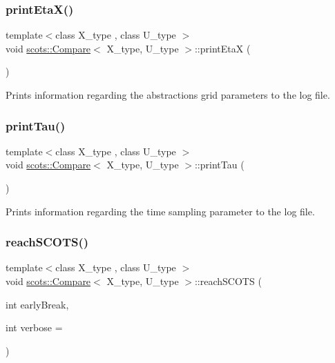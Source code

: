 \subsubsection{\texorpdfstring{print\+Eta\+X()}{printEtaX()}}
{\footnotesize\ttfamily template$<$class X\+\_\+type , class U\+\_\+type $>$ \\
void \hyperlink{classscots_1_1Compare}{scots\+::\+Compare}$<$ X\+\_\+type, U\+\_\+type $>$\+::print\+EtaX (\begin{DoxyParamCaption}{ }\end{DoxyParamCaption})\hspace{0.3cm}{\ttfamily [inline]}}

Prints information regarding the abstractions\textquotesingle{} grid parameters to the log file. \mbox{\label{classscots_1_1Compare_a318f5349a3b0465bec67a5419d630695}} 
\subsubsection{\texorpdfstring{print\+Tau()}{printTau()}}
{\footnotesize\ttfamily template$<$class X\+\_\+type , class U\+\_\+type $>$ \\
void \hyperlink{classscots_1_1Compare}{scots\+::\+Compare}$<$ X\+\_\+type, U\+\_\+type $>$\+::print\+Tau (\begin{DoxyParamCaption}{ }\end{DoxyParamCaption})\hspace{0.3cm}{\ttfamily [inline]}}

Prints information regarding the time sampling parameter to the log file. \mbox{\label{classscots_1_1Compare_a506b87a62b1adde561d725e9cc1315e9}} 
\subsubsection{\texorpdfstring{reach\+S\+C\+O\+T\+S()}{reachSCOTS()}}
{\footnotesize\ttfamily template$<$class X\+\_\+type , class U\+\_\+type $>$ \\
void \hyperlink{classscots_1_1Compare}{scots\+::\+Compare}$<$ X\+\_\+type, U\+\_\+type $>$\+::reach\+S\+C\+O\+TS (\begin{DoxyParamCaption}\item[{int}]{early\+Break,  }\item[{int}]{verbose = {} }\end{DoxyParamCaption})\hspace{0.3cm}{\ttfamily [inline]}}

